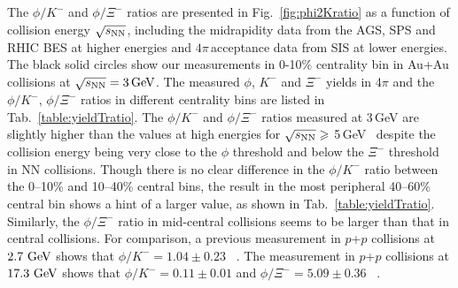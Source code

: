 \documentclass[%
 reprint,	
showpacs,
 amsmath,amssymb,
 aps,
 superscriptaddress,
]{revtex4-1}
\begin{document}
The $\phi/K^-$ and $\phi/\Xi^-$ ratios are presented in Fig.~\ref{fig:phi2Kratio} as a function of collision energy $\sqrt{s_{\rm NN}}$, including the midrapidity data from the AGS, SPS and RHIC BES at higher energies and $4\pi$\,acceptance data from SIS at lower energies. The black solid circles show our measurements in 0-10\% centrality bin in Au+Au collisions at ${\sqrt{s_{\rm NN}} = \rm{3\,GeV}}$. The measured $\phi$, $K^-$ and $\Xi^-$ yields in 4$\pi$ and the $\phi/K^-$, $\phi/\Xi^-$ ratios in different centrality bins are listed in Tab.~\ref{table:yieldTratio}. The $\phi/K^-$ and $\phi/\Xi^-$ ratios measured at 3\,GeV are %
slightly higher than the values at high energies for $\sqrt{s_{\rm NN}}\geqslant$ 5\,GeV~\cite{NA49_phi,NA49_piK,NA49_piK2,NA49_Xi,E917_phi,ALICE_phi_2p7TeV,STAR_phi_64a200GeV,Xi_ArKCl_HADES,star_bes_strangeness} despite the collision energy being very close to the $\phi$ threshold and below the $\Xi^-$ threshold in NN collisions. %
Though there is no clear difference in the $\phi/K^-$ ratio between the \textup{0--10\%} and \textup{10--40\%} central bins, the result in the most peripheral 40--60\% central bin shows a hint of a larger value, as shown in Tab.~\ref{table:yieldTratio}. Similarly, the $\phi/\Xi^-$ ratio in mid-central collisions seems to be larger than that in central collisions. For comparison, a previous measurement in $p$+$p$ collisions at $\textup{2.7 GeV}$ shows that $\phi/K^- = 1.04\pm0.23$ ~\cite{ANKE_phi}. The measurement in $p$+$p$ collisions at $\textup{17.3 GeV}$ shows that $\phi/K^- = 0.11\pm0.01$ and $\phi/\Xi^- = 5.09\pm0.36$ ~\cite{NA61SHINE_pp_piKp,NA61SHINE_pp_phi,NA61SHINE_pp_Xi}.
\end{document}
